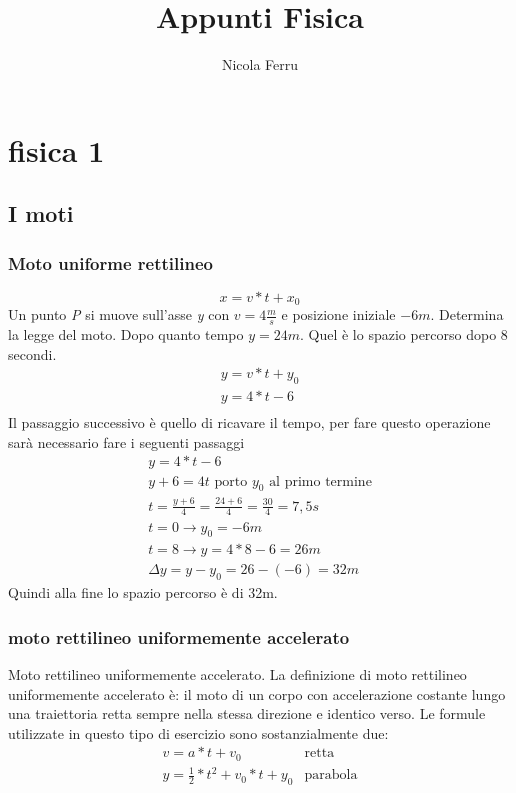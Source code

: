 \documentclass{book}
\title{Appunti Fisica}
\author{Nicola Ferru}
\date{}
\begin{document}
\maketitle
\tableofcontents
\listoftables
\listoffigures


\part{fisica 1}

\chapter{I moti}
\section{Moto uniforme rettilineo}
\begin{equation}
	x=v*t+x_0
\end{equation}
Un punto \textit{P} si muove sull'asse \textit{y} con $v=4\frac{m}{s}$ e
posizione iniziale $-6m$. Determina la legge del moto. Dopo quanto tempo
$y=24m$. Quel è lo spazio percorso dopo 8 secondi.
\begin{equation}
	\begin{matrix}
		y=v*t+y_0\\
		\boxed{y=4*t-6}\\
	\end{matrix}
\end{equation}
Il passaggio successivo è quello di ricavare il tempo, per fare questo
operazione sarà necessario fare i seguenti passaggi
\begin{equation}
	\begin{matrix}
		y=4*t-6\\
		y+6=4t \text{ porto } y_0 \text{ al primo termine}\\
		t=\frac{y+6}{4}=\frac{24+6}{4}=\frac{30}{4}=7,5s\\
		t=0\to y_0=-6m\\
		t=8\to y=4*8-6=26m\\
		\Delta y=y-y_0=26-(-6)=32m
	\end{matrix}
\end{equation}
Quindi alla fine lo spazio percorso è di 32m.
\section{moto rettilineo uniformemente accelerato}
Moto rettilineo uniformemente accelerato. La definizione di moto rettilineo
uniformemente accelerato è: il moto di un corpo con accelerazione costante
lungo una traiettoria retta sempre nella stessa direzione e identico verso. Le
formule utilizzate in questo tipo di esercizio sono sostanzialmente due:
\begin{equation}
	\begin{matrix}
			v=a*t+v_0&\text{retta}\\
			y=\frac{1}{2}*t^2+v_0*t+y_0&\text{parabola}
	\end{matrix}
\end{equation}
\end{document}
